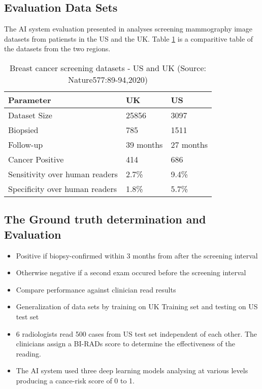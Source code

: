 \documentclass[sigconf, language=english]{acmart}
\begin{document}
\subsection{Evaluation Data Sets}
The AI system evaluation presented in \cite{Nature577} analyses screening mammography image datasets from patiensts in the US and the UK. Table \ref{screening} is a comparitive table of the datasets from the two regions.

\begin{table}
  \caption{Breast cancer screening datasets - US and UK (Source: Nature577:89-94,2020)}
  \label{screening}
  \centering
  \begin{tabular}{lll}
    \toprule
    Parameter        &  UK       &     US  \\
    \midrule
    Dataset Size     & 25856     &    3097     \\
    Biopsied         & 785       &    1511    \\
    Follow-up        & 39 months &    27 months  \\
    Cancer Positive  & 414       &    686  \\
    Sensitivity over human readers & 2.7\% & 9.4\%  \\
    Specificity over human readers & 1.8\% & 5.7\%  \\
    \bottomrule
  \end{tabular}
\end{table}

\subsection{The Ground truth determination and Evaluation}

\begin{itemize}
\item Positive if biopsy-confirmed within 3 months from after the screening interval
\item Otherwise negative if a second exam occured before the screening interval
\item Compare performance against clinician read results
\item Generalization of data sets by training on UK Training set and testing on US test set
\item 6 radiologists read 500 cases from US test set independent of each other. The clinicians assign a BI-RADs score to determine the effectiveness of the reading.
\item The AI system used three deep learning models analysing at various levels producing a cance-risk score of 0 to 1.
\end{itemize}
\end{document}

